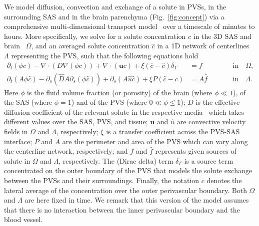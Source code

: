 \documentclass[fleqn,10pt]{wlscirep}
\newcommand{\rami}[1]{\textcolor{blue}{#1}}
\newcommand{\mer}[1]{\textcolor{magenta}{#1}}
\begin{document}
We model diffusion, convection and exchange of a solute in PVSs, in the surrounding SAS and in the brain parenchyma (Fig.~\ref{fig:concept}) via a comprehensive multi-dimensional transport model~\cite{masri2023modelling} over a timescale of minutes to hours. More specifically, we solve for a solute concentration $c$ in the 3D SAS and brain~\cite{sykova2008diffusion} $\Omega$, and an averaged solute concentration $\hat c$ in a 1D network of centerlines $\Lambda$ representing the PVS, such that the following equations hold
\begin{subequations}
\begin{alignat}{2}
  \partial_t (\phi c) - \nabla \cdot (D \nabla (\phi c) ) + \nabla \cdot (\bm u c ) + \xi (\overline{c} - \hat c ) \delta_\Gamma & = f && \quad \quad \mathrm{in} \quad \Omega, \\ 
  \partial_t (A \phi \hat c) - \partial_s(\hat D A \partial_s (\phi \hat c)) +\partial_s(A \hat u \hat c )  +  \xi P (\hat c - \overline{c})  &= A \hat f && \quad \quad \mathrm{in} \quad  \Lambda .
 \end{alignat}
\end{subequations}
Here $\phi$ is the fluid volume fraction (or porosity) of the brain (where $\phi \ll 1$), of the SAS (where $\phi = 1$) and of the PVS (where $0 \ll \phi \leq 1$); $D$ is the effective diffusion coefficient of the relevant solute in the respective media~\cite{sykova2008diffusion} which takes different values over the SAS, PVS, and tissue; $\bm u$ and $\hat u$ are convective velocity fields in $\Omega$ and $\Lambda$, respectively; $\xi$ is a transfer coefficient across the PVS-SAS interface; $P$ and $A$ are the perimeter and area of the PVS which can vary along the centerline network, respectively; and $f$ and $\hat{f}$ represents given sources of solute in $\Omega$ and $\Lambda$, respectively.  The (Dirac delta) term $\delta_\Gamma$ is a source term concentrated on the outer boundary of the PVS that models the solute exchange between the PVSs and their surroundings. Finally, the notation $\overline{c}$ denotes the lateral  average of the concentration over the outer perivascular boundary. Both $\Omega$ and $\Lambda$ are here fixed in time. We remark that this version of the model assumes that there is no interaction between the inner perivascular boundary and the blood vessel. 

\end{document}
